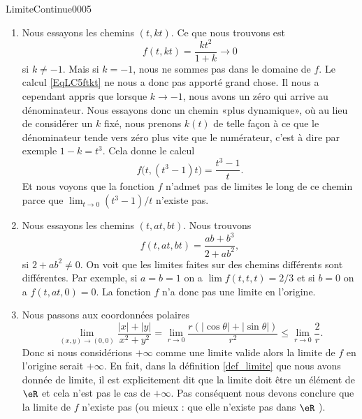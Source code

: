 \begin{corrige}{LimiteContinue0005}

	\begin{enumerate}
		\item
			Nous essayons les chemins $(t,kt)$. Ce que nous trouvons est
			\begin{equation}		\label{EqLC5ftkt}
				f(t,kt)=\frac{ kt^2 }{ 1+k }\to 0
			\end{equation}
			si $k\neq -1$. Mais si $k=-1$, nous ne sommes pas dans le domaine de $f$. Le calcul \eqref{EqLC5ftkt} ne nous a donc pas apporté grand chose. Il nous a cependant appris que lorsque $k\to -1$, nous avons un zéro qui arrive au dénominateur. Nous essayons donc un chemin «plus dynamique», où au lieu de considérer un $k$ fixé, nous prenons $k(t)$ de telle façon à ce que le dénominateur tende vers zéro plus vite que le numérateur, c'est à dire par exemple $1-k=t^3$. Cela donne le calcul
			\begin{equation}
				f\big( t,(t^3-1)t \big)=\frac{ t^3-1 }{ t }.
			\end{equation}
			Et nous voyons que la fonction $f$ n'admet pas de limites le long de ce chemin parce que $\lim_{t\to 0} (t^3-1)/t$ n'existe pas.
                        \item Nous essayons les chemins $(t, at, bt)$. Nous trouvons
                          \begin{equation}
                            f(t,at,bt) = \frac{ab+b^3}{2+ab^2},
                          \end{equation}
                          si $2+ab^2\neq 0$. On voit que les limites faites sur des chemins différents sont différentes. Par exemple, si $a=b=1$ on a $\lim f (t,t,t)= 2/3$ et si $b=0$ on a $f(t,at, 0)= 0$. La fonction $f$ n'a donc pas une limite en l'origine.
                          \item Nous passons aux coordonnées polaires
                            \begin{equation}
                              \lim_{(x,y)\to (0,0)}\frac{|x|+|y|}{x^2+y^2}=\lim_{r\to 0}\frac{r(|\cos \theta|+|\sin \theta|)}{r^2}\leq \lim_{r\to 0} \frac{2}{r}. 
                            \end{equation}
                            Donc si nous considérions $+\infty$ comme une limite valide alors  la limite de $f$ en l'origine  serait $+\infty$. En fait, dans la définition \ref{def_limite} que nous avons donnée de limite, il est explicitement dit que la limite doit être un élément de $\eR$ et cela n'est pas le cas de $+\infty$. Pas conséquent nous devons conclure que la limite de $f$  n'existe pas (ou mieux : que elle n'existe pas dans $\eR$ ). 

\end{enumerate}
\end{corrige}
